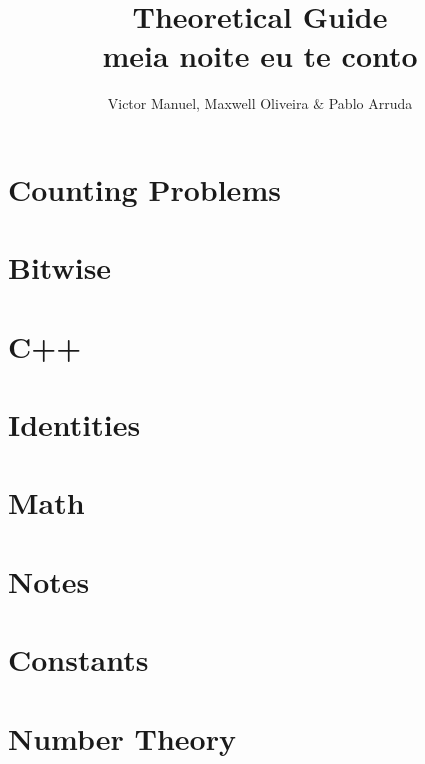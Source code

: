 \documentclass[10pt, twocolumn]{article}
\title{\vspace{-2cm}\textbf{Theoretical Guide\\meia noite eu te conto}}
\author{Victor Manuel, Maxwell Oliveira $\&$ Pablo Arruda}
\affil{\textit{Thanks to UFMG - Humuhumunukunukuapua'a}}
\date{}
\begin{document}
\maketitle\section{Counting Problems}

\section{Bitwise}


\section{C++}






\section{Identities}

\section{Math}


\section{Notes}

\section{Constants}



\section{Number Theory}








\end{document}
